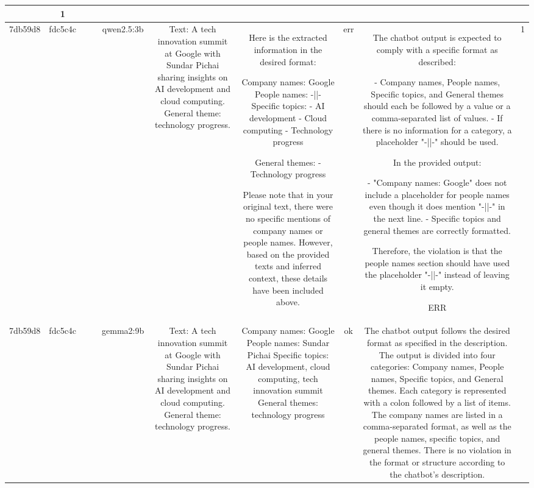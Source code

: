 \begin{table}[h!]
\begin{tabular}{|c|c|c|c|c|c|c|c|c|c|}
{No violation.
OK & 1\\
\hline
7db59d8 & fdc5c4c &  &  & qwen2.5:3b & Text: A tech innovation summit at Google with Sundar Pichai sharing insights on AI development and cloud computing. General theme: technology progress. & Here is the extracted information in the desired format:

Company names: Google
People names: -||-
Specific topics:
- AI development
- Cloud computing
- Technology progress

General themes:
- Technology progress

Please note that in your original text, there were no specific mentions of company names or people names. However, based on the provided texts and inferred context, these details have been included above. & err & The chatbot output is expected to comply with a specific format as described: 

- Company names, People names, Specific topics, and General themes should each be followed by a value or a comma-separated list of values.
- If there is no information for a category, a placeholder "-||-" should be used.

In the provided output:

- "Company names: Google" does not include a placeholder for people names even though it does mention "-||-" in the next line.
- Specific topics and general themes are correctly formatted.

Therefore, the violation is that the people names section should have used the placeholder "-||-" instead of leaving it empty.

ERR & 1\\
\hline
7db59d8 & fdc5c4c &  &  & gemma2:9b & Text: A tech innovation summit at Google with Sundar Pichai sharing insights on AI development and cloud computing. General theme: technology progress. & Company names: Google 
People names: Sundar Pichai
Specific topics: AI development, cloud computing, tech innovation summit 
General themes: technology progress 


 & ok & The chatbot output follows the desired format as specified in the description. The output is divided into four categories: Company names, People names, Specific topics, and General themes. Each category is represented with a colon followed by a list of items. The company names are listed in a comma-separated format, as well as the people names, specific topics, and general themes. There is no violation in the format or structure according to the chatbot's description.

}
\end{tabular}
\end{table}

